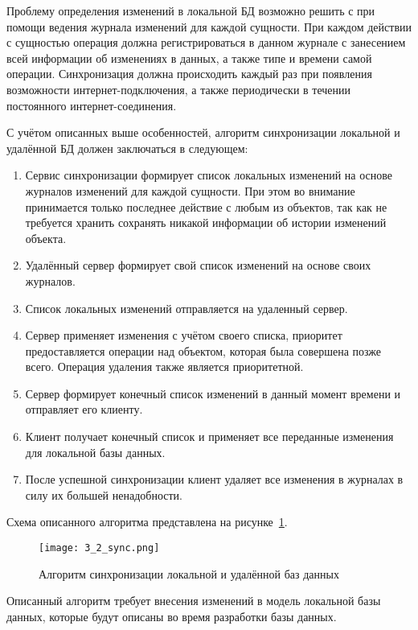 Проблему определения изменений в локальной БД возможно решить с при помощи ведения журнала изменений для каждой сущности.
При каждом действии с сущностью операция должна регистрироваться в данном журнале с занесением всей информации об изменениях в данных, а также типе и времени самой операции.
Синхронизация должна происходить каждый раз при появления возможности интернет-подключения, а также периодически в течении постоянного интернет-соединения.

С учётом описанных выше особенностей, алгоритм синхронизации локальной и удалённой БД должен заключаться в следующем:
\begin{enumerate}
    \item Сервис синхронизации формирует список локальных изменений на основе журналов изменений для каждой сущности.
    При этом во внимание принимается только последнее действие с любым из объектов, так как не требуется хранить сохранять никакой информации об истории изменений объекта.
    \item Удалённый сервер формирует свой список изменений на основе своих журналов.
    \item Список локальных изменений отправляется на удаленный сервер.
    \item Сервер применяет изменения с учётом своего списка, приоритет предоставляется операции над объектом, которая была совершена позже всего.
    Операция удаления также является приоритетной.
    \item Сервер формирует конечный список изменений в данный момент времени и отправляет его клиенту.
    \item Клиент получает конечный список и применяет все переданные изменения для локальной базы данных.
    \item После успешной синхронизации клиент удаляет все изменения в журналах в силу их большей ненадобности.
\end{enumerate}

Схема описанного алгоритма представлена на рисунке~\ref{fig:design:sync:diagram}.

\begin{figure}[p]
    \centering
    \texttt{[image: 3\_2\_sync.png]}
    \caption{Алгоритм синхронизации локальной и удалённой баз данных}
    \label{fig:design:sync:diagram}
\end{figure}

Описанный алгоритм требует внесения изменений в модель локальной базы данных, которые будут описаны во время разработки базы данных.